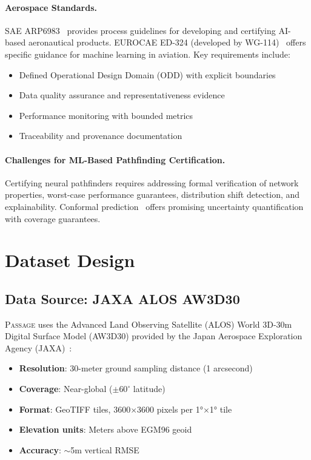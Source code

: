\documentclass{article}
\newcommand{\dataset}{\textsc{Passage}}
\begin{document}
\paragraph{Aerospace Standards.}
SAE ARP6983~\cite{arp6983} provides process guidelines for developing and certifying AI-based aeronautical products. EUROCAE ED-324 (developed by WG-114)~\cite{ed324} offers specific guidance for machine learning in aviation. Key requirements include:
\begin{itemize}[noitemsep]
    \item Defined Operational Design Domain (ODD) with explicit boundaries
    \item Data quality assurance and representativeness evidence
    \item Performance monitoring with bounded metrics
    \item Traceability and provenance documentation
\end{itemize}

\paragraph{Challenges for ML-Based Pathfinding Certification.}
Certifying neural pathfinders requires addressing formal verification of network properties, worst-case performance guarantees, distribution shift detection, and explainability. Conformal prediction~\cite{vovk2005conformal} offers promising uncertainty quantification with coverage guarantees.

\section{Dataset Design}
\label{sec:dataset}

\subsection{Data Source: JAXA ALOS AW3D30}

\dataset{} uses the Advanced Land Observing Satellite (ALOS) World 3D-30m Digital Surface Model (AW3D30) provided by the Japan Aerospace Exploration Agency (JAXA)~\cite{tadono2014alos}:

\begin{itemize}[noitemsep]
    \item \textbf{Resolution}: 30-meter ground sampling distance (1 arcsecond)
    \item \textbf{Coverage}: Near-global ($\pm 60^\circ$ latitude)
    \item \textbf{Format}: GeoTIFF tiles, 3600$\times$3600 pixels per 1°$\times$1° tile
    \item \textbf{Elevation units}: Meters above EGM96 geoid
    \item \textbf{Accuracy}: $\sim$5m vertical RMSE
\end{itemize}
\end{document}

